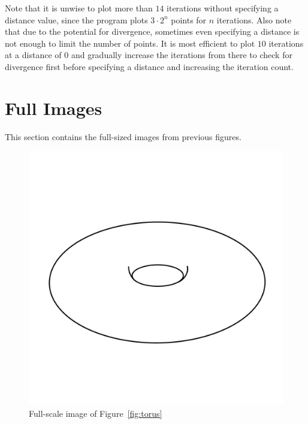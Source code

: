 \documentclass[12pt,a4paper,reqno,parskip=full]{amsart}
\numberwithin{equation}{section}
\theoremstyle{plain}
\theoremstyle{definition}
\begin{document}
Note that it is unwise to plot more than $14$ iterations without specifying a distance value, since the program plots $3\cdot2^n$ points for $n$ iterations. Also note that due to the potential for divergence, sometimes even specifying a distance is not enough to limit the number of points. It is most efficient to plot $10$ iterations at a distance of $0$ and gradually increase the iterations from there to check for divergence first before specifying a distance and increasing the iteration count. 



\newpage


\newpage
\listoffigures

\newpage
\section{Full Images}

This section contains the full-sized images from previous figures.

\begin{figure}[H]
    \centering
    \includegraphics[width=\textwidth]{images/plain torus.jpg}
    \caption{Full-scale image of Figure~\ref{fig:torus}}
\end{figure}
\end{document}
